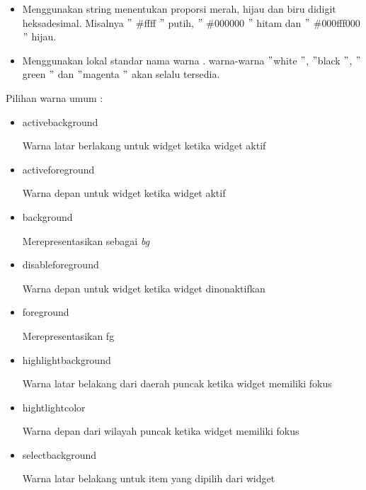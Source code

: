 \documentclass{wileySix}
\begin{document}
\begin{myEnumerate}
\begin{myEnumerate}
{\begin{myEnumerate}
	\noindent 
	\begin{itemize}
		\item Menggunakan string menentukan proporsi merah, hijau dan biru didigit heksadesimal. Misalnya  $ " $ $  \#  $ffff $ " $ putih,  $ " $ $  \#  $000000 $ " $ hitam dan  $ " $ $  \#  $000fff000 $ " $ hijau. \par
		\noindent 
		\item Menggunakan lokal standar nama warna . warna-warna  $ " $white $ " $, $ " $black $ " $,  $ " $green $ " $ dan  $ " $magenta $ " $ akan selalu tersedia.\end{itemize}
	\par
	\vspace{12pt}
	Pilihan warna umum : \par
	\noindent 
	\begin{itemize}
		\item activebackground \par
		Warna latar berlakang untuk widget ketika widget aktif \par
		\noindent 
		\item activeforeground \par
		Warna depan untuk widget ketika widget aktif \par
		\noindent 
		\item background \par
		Merepresentasikan sebagai \textit{bg} \par
		\noindent 
		\item disableforeground \par
		Warna depan untuk widget ketika widget dinonaktifkan \par
		\noindent 
		\item foreground \par
		Merepresentasikan fg \par
		\noindent 
		\item highlightbackground \par
		Warna latar belakang dari daerah puncak ketika widget memiliki fokus \par
		\noindent 
		\item hightlightcolor \par
		Warna depan dari wilayah puncak ketika widget memiliki fokus \par
		\noindent 
		\item selectbackground \par
		Warna latar belakang untuk item yang dipilih dari widget \par

\end{itemize}
\end{myEnumerate}}
\end{myEnumerate}
\end{myEnumerate}
\end{document}
